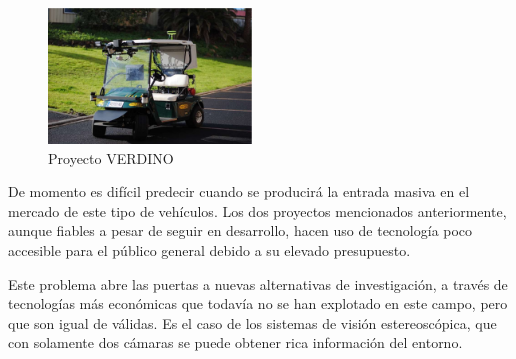 \begin{figure}
  \vspace{-20pt}
  \begin{center}
    \includegraphics[width=0.48\textwidth]{images/cap1/Verdino.eps}
  \end{center}
  \vspace{-20pt}
  \caption{Proyecto VERDINO}
  \vspace{-10pt}
  \label{fig:ProyectoVERDINO}
\end{figure}

De momento es difícil predecir cuando se producirá la entrada masiva en el
mercado de este tipo de vehículos. Los dos proyectos mencionados anteriormente,
aunque fiables a pesar de seguir en desarrollo, hacen uso de tecnología poco
accesible para el público general debido a su elevado presupuesto.

Este problema abre las puertas a nuevas alternativas de investigación, a través
de tecnologías más económicas que todavía no se han explotado en este campo,
pero que son igual de válidas. Es el caso de los sistemas de visión
estereoscópica, que con solamente dos cámaras se puede obtener rica información
del entorno.

